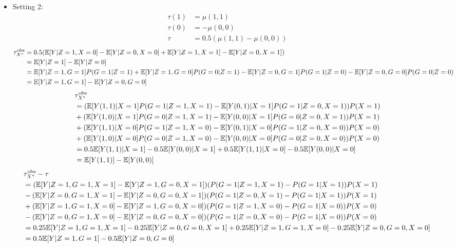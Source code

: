 \documentclass[10pt]{article}
\begin{document}
\begin{itemize}

\item
Setting 2:
\begin{align*}
\tau(1) &= \mu(1,1) \\
\tau(0) &= - \mu(0,0) \\
\tau &= 0.5(\mu(1,1) - \mu(0,0))
\end{align*}
\begin{align*}
\tau_{X^*}^\text{obs} &= 0.5(\mathbb{E}[Y|Z=1,X=0] - \mathbb{E}[Y|Z=0,X=0] + \mathbb{E}[Y|Z=1,X=1] - \mathbb{E}[Y|Z=0,X=1]) \\
&= \mathbb{E}[Y|Z=1] - \mathbb{E}[Y|Z=0] \\
&= \mathbb{E}[Y|Z=1,G=1]P(G=1|Z=1) + \mathbb{E}[Y|Z=1,G=0]P(G=0|Z=1) - \mathbb{E}[Y|Z=0,G=1]P(G=1|Z=0) - \mathbb{E}[Y|Z=0,G=0]P(G=0|Z=0) \\
&= \mathbb{E}[Y|Z=1,G=1] - \mathbb{E}[Y|Z=0,G=0]
\end{align*}
\begin{align*}
&\tau_{X^*}^\text{obs} \\
&= (\mathbb{E}[Y(1,1)|X=1]P(G=1|Z=1,X=1) - \mathbb{E}[Y(0,1)|X=1]P(G=1|Z=0,X=1))P(X=1) \\
& + (\mathbb{E}[Y(1,0)|X=1]P(G=0|Z=1,X=1) - \mathbb{E}[Y(0,0)|X=1]P(G=0|Z=0,X=1))P(X=1) \\
& + (\mathbb{E}[Y(1,1)|X=0]P(G=1|Z=1,X=0) - \mathbb{E}[Y(0,1)|X=0]P(G=1|Z=0,X=0))P(X=0) \\
& + (\mathbb{E}[Y(1,0)|X=0]P(G=0|Z=1,X=0) - \mathbb{E}[Y(0,0)|X=0]P(G=0|Z=0,X=0))P(X=0) \\
&= 0.5\mathbb{E}[Y(1,1)|X=1] - 0.5\mathbb{E}[Y(0,0)|X=1] + 0.5\mathbb{E}[Y(1,1)|X=0] - 0.5\mathbb{E}[Y(0,0)|X=0] \\
&= \mathbb{E}[Y(1,1)] - \mathbb{E}[Y(0,0)]
\end{align*}
\begin{align*}
&\tau_{X^*}^\text{obs} - \tau \\
&=(\mathbb{E}[Y|Z=1,G=1,X=1]-\mathbb{E}[Y|Z=1,G=0,X=1])(P(G=1|Z=1,X=1)-P(G=1|X=1))P(X=1) \\
&- (\mathbb{E}[Y|Z=0,G=1,X=1]-\mathbb{E}[Y|Z=0,G=0,X=1])(P(G=1|Z=0,X=1)-P(G=1|X=1))P(X=1) \\
&+ (\mathbb{E}[Y|Z=1,G=1,X=0]-\mathbb{E}[Y|Z=1,G=0,X=0])(P(G=1|Z=1,X=0)-P(G=1|X=0))P(X=0) \\
&- (\mathbb{E}[Y|Z=0,G=1,X=0]-\mathbb{E}[Y|Z=0,G=0,X=0])(P(G=1|Z=0,X=0)-P(G=1|X=0))P(X=0) \\
&= 0.25\mathbb{E}[Y|Z=1,G=1,X=1] - 0.25\mathbb{E}[Y|Z=0,G=0,X=1] + 0.25\mathbb{E}[Y|Z=1,G=1,X=0] - 0.25\mathbb{E}[Y|Z=0,G=0,X=0] \\
&= 0.5\mathbb{E}[Y|Z=1,G=1] - 0.5\mathbb{E}[Y|Z=0,G=0]
\end{align*}

\end{itemize}
\end{document}
